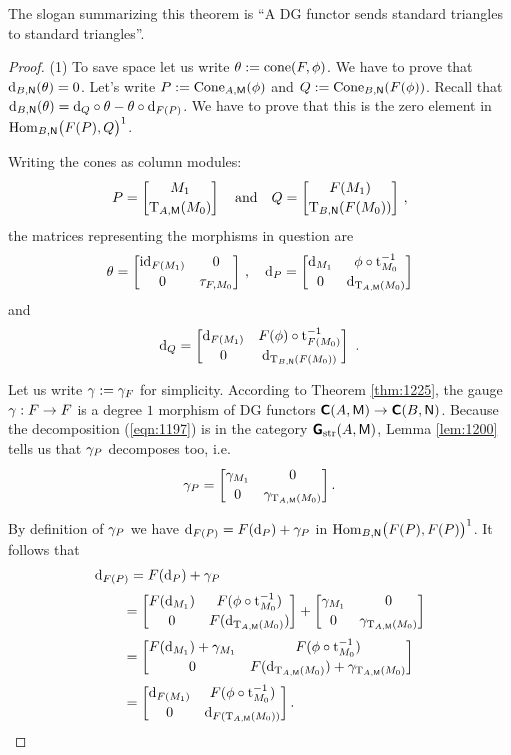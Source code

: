The slogan summarizing this theorem is ``A DG functor sends standard triangles 
to standard triangles''. 

\begin{proof} \mbox{}

\smallskip \noindent
(1) To save space let us write $\theta := \operatorname{cone}(F, \phi)$. 
We have to prove that $\mathrm{d}_{B, \operatorname{\mathsf{N}}}(\theta) = 0$. 
Let's write 
$P := \operatorname{Cone}_{A, \operatorname{\mathsf{M}}}(\phi)$
and 
$Q := \operatorname{Cone}_{B, \operatorname{\mathsf{N}}}(F(\phi))$.
Recall that 
$\mathrm{d}_{B, \operatorname{\mathsf{N}}}(\theta) =  \mathrm{d}_{Q} \circ \theta - \theta \circ \mathrm{d}_{F(P)}$.
We have to prove that this is the zero element in 
$\operatorname{Hom}_{B, \operatorname{\mathsf{N}}} \bigl( F(P), Q \bigr)^1$.
 
Writing the cones as column modules:
\[ P = \begin{bmatrix}  M_1 \\[0.2em] \operatorname{T}_{A, \operatorname{\mathsf{M}}}(M_0)  \end{bmatrix}  
\quad \textup{and}  \quad 
Q = \begin{bmatrix}  F(M_1) \\[0.2em] \operatorname{T}_{B, \operatorname{\mathsf{N}}}(F(M_0))  \end{bmatrix} \, , \]
the matrices representing the morphisms in question are
\[ \theta = 
\begin{bmatrix} \operatorname{id}_{F(M_1)} & 0 \\[0.2em] 0 & \tau_{F, M_0}  \end{bmatrix} 
\, , \quad 
\mathrm{d}_P = \begin{bmatrix} \mathrm{d}_{M_1} & \phi \circ \operatorname{t}_{M_0}^{-1} 
\\[0.2em] 0 & \mathrm{d}_{\operatorname{T}_{A, \operatorname{\mathsf{M}}}(M_0)}  \end{bmatrix} \]
and \[  
\mathrm{d}_Q = \begin{bmatrix} \mathrm{d}_{F(M_1)} & F(\phi) \circ \operatorname{t}_{F(M_0)}^{-1} 
\\[0.2em] 0 & \mathrm{d}_{\operatorname{T}_{B, \operatorname{\mathsf{N}}}(F(M_0))}  \end{bmatrix} \ . \] 

Let us write $\gamma := \gamma_F$ for simplicity. 
According to Theorem \ref{thm:1225}, the gauge 
$\gamma : F \to F$ is a degree $1$ morphism of DG functors
$\boldsymbol{\mathsf{C}}(A, \operatorname{\mathsf{M}}) \to \boldsymbol{\mathsf{C}}(B, \operatorname{\mathsf{N}})$.
Because the decomposition (\ref{eqn:1197}) is in the 
category $\boldsymbol{\mathsf{G}}_{\mathrm{str}}(A, \operatorname{\mathsf{M}})$, Lemma \ref{lem:1200} tells us that 
$\gamma_P$ decomposes too, i.e.\ 
\[ \gamma_P =  \begin{bmatrix}  \gamma_{M_1} & 0 \\[0.2em] 0 & \gamma_{\operatorname{T}_{A, \operatorname{\mathsf{M}}}(M_0)} 
 \end{bmatrix} . \]

By definition of $\gamma_P$ we have 
$\mathrm{d}_{F(P)} = F(\mathrm{d}_P) + \gamma_P$ in 
$\operatorname{Hom}_{B, \operatorname{\mathsf{N}}} \bigl( F(P), F(P) \bigr)^1$.
It follows that 
\[ \begin{aligned}
& \mathrm{d}_{F(P)} = F(\mathrm{d}_P) + \gamma_P  
\\[0.2em]
& \qquad 
= \begin{bmatrix}  F(\mathrm{d}_{M_1})  & 
F(\phi \circ \operatorname{t}_{M_0}^{-1}) 
\\[0.2em] 0 & F(\mathrm{d}_{\operatorname{T}_{A, \operatorname{\mathsf{M}}}(M_0)})   \end{bmatrix} +
\begin{bmatrix}  \gamma_{M_1} & 0 \\[0.2em] 0 & \gamma_{\operatorname{T}_{A, \operatorname{\mathsf{M}}}(M_0)}  \end{bmatrix} 
\\[0.2em]
& \qquad 
= \begin{bmatrix}  F(\mathrm{d}_{M_1}) +  \gamma_{M_1} & 
F(\phi \circ \operatorname{t}_{M_0}^{-1}) 
\\[0.2em] 0 & 
F(\mathrm{d}_{\operatorname{T}_{A, \operatorname{\mathsf{M}}}(M_0)}) + \gamma_{\operatorname{T}_{A, \operatorname{\mathsf{M}}}(M_0)}  \end{bmatrix}
\\[0.2em]
& \qquad 
= \begin{bmatrix}  \mathrm{d}_{F(M_1)} & 
F(\phi \circ \operatorname{t}_{M_0}^{-1}) 
\\[0.2em] 0 & \mathrm{d}_{F(\operatorname{T}_{A, \operatorname{\mathsf{M}}}(M_0))}  \end{bmatrix} .
\end{aligned}   \]


\end{proof}
